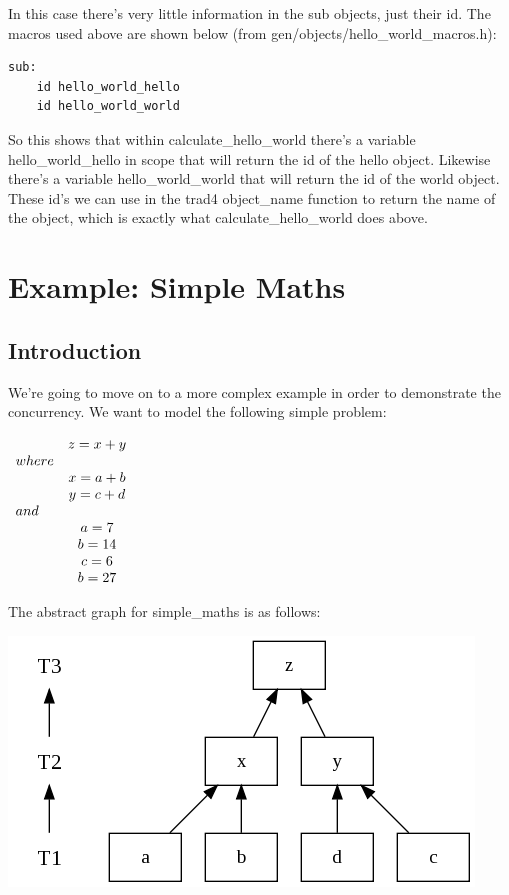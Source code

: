\documentclass{report}
\begin{document}
In this case there's very little information in the sub objects, just their id. The macros used above are shown below (from gen/objects/hello_world_macros.h):

\begin{verbatim}
sub:
    id hello_world_hello
    id hello_world_world
\end{verbatim}

So this shows that within calculate_hello_world there's a variable hello_world_hello in scope that will return the id of the hello object. Likewise there's a variable hello_world_world that will return the id of the world object. These id's we can use in the trad4 object_name function to return the name of the object, which is exactly what calculate_hello_world does above.

\chapter{Example: Simple Maths}

\section{Introduction}

We're going to move on to a more complex example in order to demonstrate the concurrency. We want to model the following simple problem:

\begin{math}
  \begin{array}{ l c }
        & z = x + y   \\
        where         \\
        & x = a + b   \\
        & y = c + d   \\
        and           \\
        & a = 7       \\
        & b = 14      \\
        & c = 6       \\
        & b = 27      \\
  \end{array} 
\end{math}

The abstract graph for simple_maths is as follows:

\includegraphics[scale=0.5]{simplemathsabstract.png}
\end{document}
